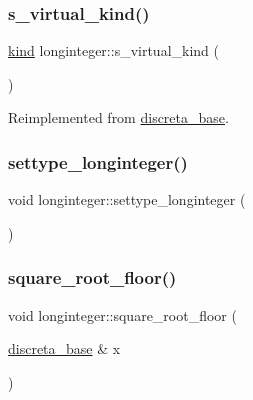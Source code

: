 \subsubsection{\texorpdfstring{s\+\_\+virtual\+\_\+kind()}{s\_virtual\_kind()}}
{\footnotesize\ttfamily \mbox{\hyperlink{discreta_8h_aaf25ee7e2306d78c74ec7bc48f092e81}{kind}} longinteger\+::s\+\_\+virtual\+\_\+kind (\begin{DoxyParamCaption}{ }\end{DoxyParamCaption})\hspace{0.3cm}{\ttfamily [virtual]}}



Reimplemented from \mbox{\hyperlink{classdiscreta__base_a52778a6d6943a468be083d0785d418fb}{discreta\+\_\+base}}.

\mbox{\label{classlonginteger_ae5f811ece8df31b9ff114368a18e1dc5}} 
\subsubsection{\texorpdfstring{settype\+\_\+longinteger()}{settype\_longinteger()}}
{\footnotesize\ttfamily void longinteger\+::settype\+\_\+longinteger (\begin{DoxyParamCaption}{ }\end{DoxyParamCaption})}

\mbox{\label{classlonginteger_a1b5b30f8bc750d1304390f518e43aa0f}} 
\subsubsection{\texorpdfstring{square\+\_\+root\+\_\+floor()}{square\_root\_floor()}}
{\footnotesize\ttfamily void longinteger\+::square\+\_\+root\+\_\+floor (\begin{DoxyParamCaption}\item[{\mbox{\hyperlink{classdiscreta__base}{discreta\+\_\+base}} \&}]{x }\end{DoxyParamCaption})}

\mbox{\label{classlonginteger_a082d0c05f45c21f188e17a8463a42800}} 
